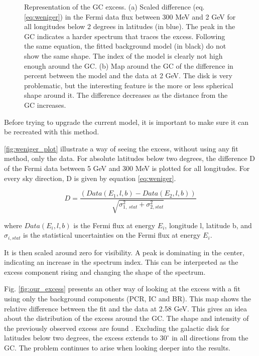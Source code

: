 \begin{figure}[h]
\begin{minipage}[h]{0.45\textwidth}
	  \subcaption{}
	  \label{fig:our_excess}
  \end{minipage}
  \caption[Representation of the GC excess.]{Representation of the GC excess. (a) Scaled difference (eq. \ref{eq:weniger}) in the Fermi data flux between 300 MeV and 2 GeV for all longitudes below 2 degrees in latitudes (in blue). The peak in the GC indicates a harder spectrum that traces the excess. Following the same equation, the fitted background model (in black) do not show the same shape. The index of the model is clearly not high enough around the GC. (b) Map around the GC of the difference in percent between the model and the data at 2 GeV. The disk is very problematic, but the interesting feature is the more or less spherical shape around it. The difference decreases as the distance from the GC increases.}
  \label{fig:GC_excess}	 
\end{figure}

Before trying to upgrade the current model, it is important to make sure it can be recreated with this method. 

\ref{fig:weniger_plot} illustrate a way of seeing the excess, without using any fit method, only the data. For absolute latitudes below two degrees, the difference D of the Fermi data between 5 GeV and 300 MeV is plotted for all longitudes. For every sky direction, D is given by equation \ref{eq:weniger}.

\begin{equation}
\label{eq:weniger}
D = \frac{\left(Data(E_1, l, b) - Data(E_2, l, b) \right)}{\sqrt{\sigma_{1,\ stat}^2 + \sigma_{2, stat}^2}}
\end{equation}

where $Data(E_i,l,b)$ is the Fermi flux at energy $E_i$, longitude l, latitude b, and $\sigma_{i, stat}$ is the statistical uncertainties on the Fermi flux at energy $E_i$.

It is then scaled around zero for visibility. A peak is dominating in the center, indicating an increase in the spectrum index. This can be interpreted as the excess component rising and changing the shape of the spectrum.

Fig. \ref{fig:our_excess} presents an other way of looking at the excess with a fit using only the background components (PCR, IC and BR). This map shows the relative difference between the fit and the data at 2.58 GeV. This gives an idea about the distribution of the excess around the GC. The shape and intensity of the previously observed excess are found \cite{Hooper2011}. Excluding the galactic disk for latitudes below two degrees, the excess extends to $30^\circ$ in all directions from the GC. The problem continues to arise when looking deeper into the results.



